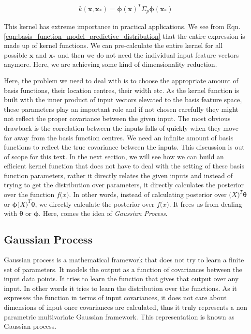 \documentclass[english]{tktltiki}
\begin{document}
\begin{equation}
\label{eqn:basis_function_model_kernel}
\begin{split}
	k(\mathbf{x}, \mathbf{x_*}) = \boldsymbol\phi(\mathbf{x})^T \Sigma_p \boldsymbol\phi(\mathbf{x_*})
\end{split}
\end{equation}

This kernel has extreme importance in practical applications. We see from Eqn. \ref{eqn:basis_function_model_predictive_distribution} that the entire expression is made up of kernel functions. We can pre-calculate the entire kernel for all possible $\mathbf{x}$ and $\mathbf{x_*}$ and then we do not need the individual input feature vectors anymore. Here, we are achieving some kind of dimensionality reduction.

Here, the problem we need to deal with is to choose the appropriate amount of basis functions, their location centres, their width etc. As the kernel function is built with the inner product of input vectors elevated to the basis feature space, these parameters play an important role and if not chosen carefully they might not reflect the proper covariance between the given input. The most obvious drawback is the correlation between the inputs falls of quickly when they move far away from the basis function centres. We need an infinite amount of basis functions to reflect the true covariance between the inputs. This discussion is out of scope for this text. In the next section, we will see how we can build an efficient kernel function that does not have to deal with the setting of these basis function parameters, rather it directly relates the given inputs and instead of trying to get the distribution over parameters, it directly calculates the posterior over the function $f\mathbf(x)$. In other words, instead of calculating posterior over $\mathbf(X)^T \boldsymbol\theta$ or $\boldsymbol\phi \mathbf(X)^T \boldsymbol\theta$, we directly calculate the posterior over $f\mathbf(x)$. It frees us from dealing with $\boldsymbol \theta$ or $\boldsymbol \phi$. Here, comes the idea of \textit{Gaussian Process}.

\subsection{Gaussian Process}

Gaussian process \cite{gaussian_process_for_machine_learning} is a mathematical framework that does not try to learn a finite set of parameters. It models the output as a function of covariances between the input data points. It tries to learn the function that gives that output over any input. In other words it tries to learn the distribution over the functions. As it expresses the function in terms of input covariances, it does not care about dimensions of input once covariances are calculated, thus it truly represents a non parametric multivariate Gaussian framework. This representation is known as Gaussian process.
\end{document}
